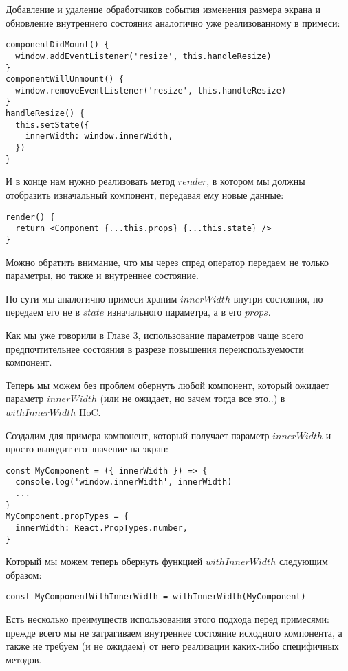 Добавление и удаление обработчиков события изменения размера экрана и обновление внутреннего состояния аналогично уже реализованному в примеси:

\begin{lstlisting}
componentDidMount() {
  window.addEventListener('resize', this.handleResize)
}
componentWillUnmount() {
  window.removeEventListener('resize', this.handleResize)
}
handleResize() {
  this.setState({
    innerWidth: window.innerWidth,
  })
}
\end{lstlisting}

И в конце нам нужно реализовать метод $render$, в котором мы должны отобразить изначальный компонент, передавая ему новые данные:

\begin{lstlisting}
render() {
  return <Component {...this.props} {...this.state} />
}
\end{lstlisting}

Можно обратить внимание, что мы через спред оператор передаем не только параметры, но также и внутреннее состояние.

По сути мы аналогично примеси храним $innerWidth$ внутри состояния, но передаем его не в $state$ изначального параметра, а в его $props$.

Как мы уже говорили в Главе 3, использование параметров чаще всего предпочтительнее состояния в разрезе повышения переиспользуемости компонент.

Теперь мы можем без проблем обернуть любой компонент, который ожидает параметр $innerWidth$ (или не ожидает, но зачем тогда все это..) в $withInnerWidth$ HoC.

Создадим для примера компонент, который получает параметр $innerWidth$ и просто выводит его значение на экран:

\begin{lstlisting}
const MyComponent = ({ innerWidth }) => {
  console.log('window.innerWidth', innerWidth)
  ...
}
MyComponent.propTypes = {
  innerWidth: React.PropTypes.number,
}
\end{lstlisting}

Который мы можем теперь обернуть функцией $withInnerWidth$ следующим образом:

\begin{lstlisting}
const MyComponentWithInnerWidth = withInnerWidth(MyComponent)
\end{lstlisting}

Есть несколько преимуществ использования этого подхода перед примесями: прежде всего мы не затрагиваем внутреннее состояние исходного компонента, а также не требуем (и не ожидаем) от него реализации каких-либо специфичных методов.

